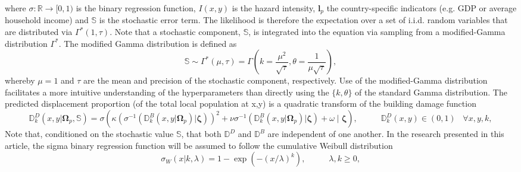 \documentclass[10pt,a4paper]{article}
\begin{document}
\begin{multicols}{1}
\begin{equation}
\end{equation}
where $\sigma:\mathbb{R}\rightarrow [0,1)$ is the binary regression function, $I(x,y)$ is the hazard intensity, $\boldsymbol{l}_p$ the country-specific indicators (e.g. GDP or average household income) and $\mathbb{S}$ is the stochastic error term. The likelihood is therefore the expectation over a set of i.i.d. random variables that are distributed via $\Gamma^*(1,\tau)$. Note that a stochastic component, $\mathbb{S}$, is integrated into the equation via sampling from a modified-Gamma distribution $\Gamma^*$. The modified Gamma distribution is defined as
\begin{equation}
 \mathbb{S}\sim \Gamma^*(\mu,\tau)=\Gamma\left(k=\frac{\mu^2}{\sqrt{\tau}},\theta=\frac{1}{\mu\sqrt{\tau}}\right),
\end{equation}
whereby $\mu=1$ and $\tau$ are the mean and precision of the stochastic component, respectively. Use of the modified-Gamma distribution facilitates a more intuitive understanding of the hyperparameters than directly using the $\{k,\theta\}$ of the standard Gamma distribution. The predicted displacement proportion (of the total local population at x,y) is a quadratic transform of the building damage function
\begin{equation}\label{eq:dispprobPH}
  \mathbb{D}^{D}_k(x,y|\boldsymbol{\Omega}_p,\mathbb{S})=\sigma\left(\kappa\left(\sigma^{-1}\left(\mathbb{D}^{B}_k(x,y|\boldsymbol{\Omega}_p)\Big| \boldsymbol{\zeta}\right)\right)^2 + \nu\sigma^{-1}\left(\mathbb{D}^{B}_k(x,y|\boldsymbol{\Omega}_p)\Big| \boldsymbol{\zeta}\right)+\omega\;\bigg|\; \boldsymbol{\zeta}\right),\;\;\;\;\;\;\;\;\;\; \mathbb{D}^{D}_k(x,y) \in (0,1) \;\;\; \forall x,y,k,
\end{equation}
Note that, conditioned on the stochastic value $\mathbb{S}$, that both $\mathbb{D}^{D}$ and $\mathbb{D}^{B}$ are independent of one another. In the research presented in this article, the sigma binary regression function will be assumed to follow the cumulative Weibull distribution
\begin{equation}\label{eq:weibull}
  \sigma_W(x|k,\lambda) = 1-\exp\left(-(x/\lambda)^k\right), \;\;\;\;\;\;\;\;\;\; \lambda, k \geq 0,
\end{equation}

\end{multicols}
\end{document}
